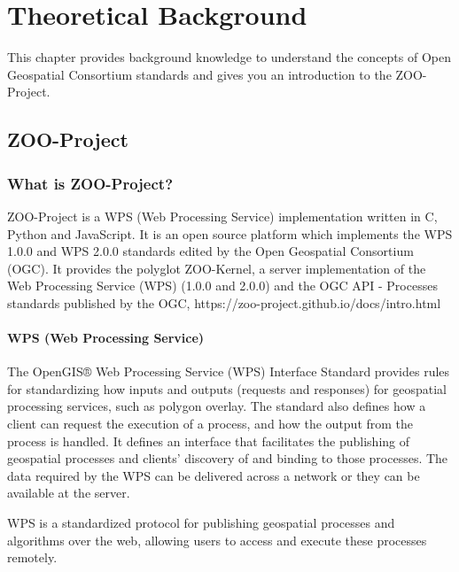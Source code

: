 \documentclass[class=scrbook, crop=false]{standalone}
\begin{document}
\ifstandalone

    
\fi

\chapter{Theoretical Background}
\label{Chapter::Theoretical_Background} %
This chapter provides background knowledge to understand the concepts of Open Geospatial Consortium standards and gives you an introduction to the ZOO-Project.


\section{ZOO-Project}
\label{Section:: ZOO-Project}

\subsection{What is ZOO-Project?}
ZOO-Project is a WPS (Web Processing Service) implementation written in C, Python and JavaScript. It is an open source platform which implements the WPS 1.0.0 and WPS 2.0.0 standards edited by the Open Geospatial Consortium (OGC).
It provides the polyglot ZOO-Kernel, a server implementation of the Web Processing Service (WPS) (1.0.0 and 2.0.0) and the OGC API - Processes standards published by the OGC, https://zoo-project.github.io/docs/intro.html



\subsubsection{WPS (Web Processing Service)}
The OpenGIS® Web Processing Service (WPS) Interface Standard provides rules for standardizing how inputs and outputs (requests and responses) for geospatial processing services, such as polygon overlay. The standard also defines how a client can request the execution of a process, and how the output from the process is handled. It defines an interface that facilitates the publishing of geospatial processes and clients’ discovery of and binding to those processes. The data required by the WPS can be delivered across a network or they can be available at the server.

WPS is a standardized protocol for publishing geospatial processes and algorithms over the web, allowing users to access and execute these processes remotely.
\end{document}
